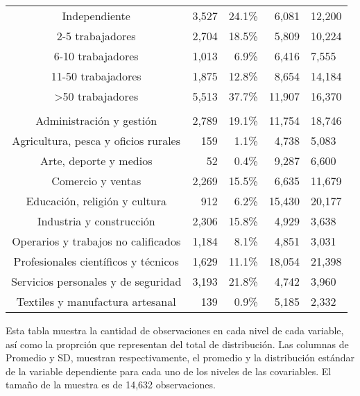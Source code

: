 \begin{longtable}{crrrl}
\midrule\addlinespace[2.5pt]
\multicolumn{5}{l}{{\bfseries Cantidad de trabajadores
de la empresa en que trabaja}} \\[2.5pt] 
\midrule\addlinespace[2.5pt]
Independiente & 3,527 & 24.1\% &  6,081 & 12,200 \\ 
2-5 trabajadores & 2,704 & 18.5\% &  5,809 & 10,224 \\ 
6-10 trabajadores & 1,013 &  6.9\% &  6,416 &  7,555 \\ 
11-50 trabajadores & 1,875 & 12.8\% &  8,654 & 14,184 \\ 
>50 trabajadores & 5,513 & 37.7\% & 11,907 & 16,370 \\ 
\midrule\addlinespace[2.5pt]
\multicolumn{5}{l}{{\bfseries Oficio}} \\[2.5pt] 
\midrule\addlinespace[2.5pt]
Administración y gestión & 2,789 & 19.1\% & 11,754 & 18,746 \\ 
Agricultura, pesca y oficios rurales &   159 &  1.1\% &  4,738 &  5,083 \\ 
Arte, deporte y medios &    52 &  0.4\% &  9,287 &  6,600 \\ 
Comercio y ventas & 2,269 & 15.5\% &  6,635 & 11,679 \\ 
Educación, religión y cultura &   912 &  6.2\% & 15,430 & 20,177 \\ 
Industria y construcción & 2,306 & 15.8\% &  4,929 &  3,638 \\ 
Operarios y trabajos no calificados & 1,184 &  8.1\% &  4,851 &  3,031 \\ 
Profesionales científicos y técnicos & 1,629 & 11.1\% & 18,054 & 21,398 \\ 
Servicios personales y de seguridad & 3,193 & 21.8\% &  4,742 &  3,960 \\ 
Textiles y manufactura artesanal &   139 &  0.9\% &  5,185 &  2,332 \\ 
\bottomrule
\end{longtable}
\begin{minipage}{\linewidth}
Esta tabla muestra la cantidad de observaciones en cada nivel de cada variable, 
                                             así como la proprción que representan del total de distribución.
                                             Las columnas de Promedio y SD, muestran respectivamente, el promedio y la distribución estándar
                                             de la variable dependiente para cada uno de los niveles de las covariables. 
                                             El tamaño de la muestra es de 14,632 observaciones.\\
\end{minipage}
\endgroup
